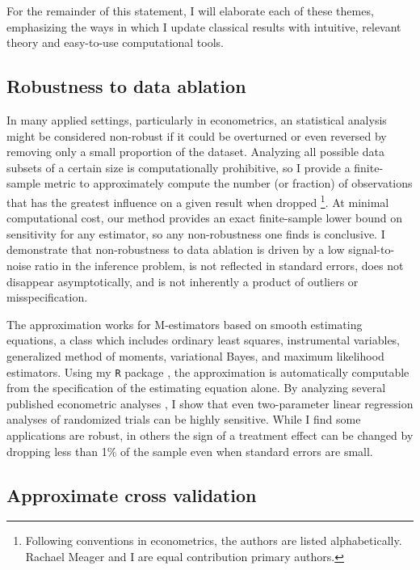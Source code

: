 For the remainder of this statement, I will elaborate each of these themes,
emphasizing the ways in which I update classical results with intuitive,
relevant theory and easy-to-use computational tools.

\newpage



\subsection*{Robustness to data ablation}

In many applied settings, particularly in econometrics, an statistical analysis
might be considered non-robust if it could be overturned or even reversed by
removing only a small proportion of the dataset. Analyzing all possible data
subsets of a certain size is computationally prohibitive, so I provide a
finite-sample metric to approximately compute the number (or fraction) of
observations that has the greatest influence on a given result when dropped
\citep{giordano:2020:amip}\footnote{Following conventions in econometrics, the
authors are listed alphabetically.  Rachael Meager and I are equal contribution
primary authors.}.  At minimal computational cost, our method provides an exact
finite-sample lower bound on sensitivity for any estimator, so any
non-robustness one finds is conclusive. I demonstrate that non-robustness to
data ablation is driven by a low signal-to-noise ratio in the inference problem,
is not reflected in standard errors, does not disappear asymptotically, and is
not inherently a product of outliers or misspecification.

The approximation works for M-estimators based on smooth estimating equations, a
class which includes ordinary least squares, instrumental variables, generalized
method of moments, variational Bayes, and maximum likelihood estimators. Using
my \texttt{R} package \citep{zaminfluence}, the approximation is automatically
computable from the specification of the estimating equation alone.  By
analyzing several published econometric analyses \citep{angelucci:2009:indirect,
finkelstein:2012:oregon, meager:2019:microcredit}, I show that even two-parameter
linear regression analyses of randomized trials can be highly sensitive.  While
I find some applications are robust, in others the sign of a treatment effect
can be changed by dropping less than 1\% of the sample even when standard errors
are small.


\subsection*{Approximate cross validation}

